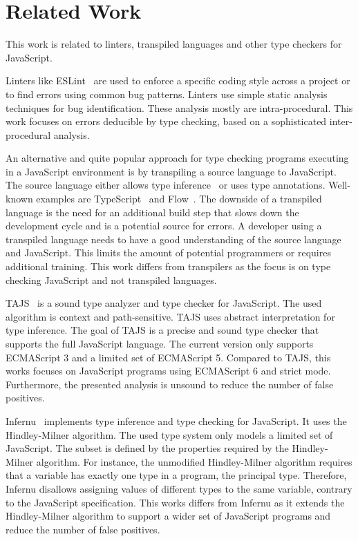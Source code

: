 \section{Related Work}\label{sec:related-work}
This work is related to linters, transpiled languages and other type checkers for JavaScript. 

Linters like ESLint~\cite{jQuery2016} are used to enforce a specific coding style across a project or to find errors using common bug patterns. Linters use simple static analysis techniques for bug identification. These analysis mostly are intra-procedural. This work focuses on errors deducible by type checking, based on a sophisticated inter-procedural analysis. 


An alternative and quite popular approach for type checking programs executing in a JavaScript environment is by transpiling a source language to JavaScript. The source language either allows type inference~\cite{Ekblad2012, McKenna} or uses type annotations. Well-known examples are TypeScript~\cite{Microsoft2012} and Flow~\cite{Facebook2014}. The downside of a transpiled language is the need for an additional build step that slows down the development cycle and is a potential source for errors. A developer using a transpiled language needs to have a good understanding of the source language and JavaScript. This limits the amount of potential programmers or requires additional training. This work differs from transpilers as the focus is on type checking JavaScript and not transpiled languages.

TAJS~\cite{JensenMollerThiemann2009} is a sound type analyzer and type checker for JavaScript. The used algorithm is context and path-sensitive. TAJS uses abstract interpretation for type inference. The goal of TAJS is a precise and sound type checker that supports the full JavaScript language. The current version only supports ECMAScript 3 and a limited set of ECMAScript 5. Compared to TAJS, this works focuses on JavaScript programs using ECMAScript 6 and strict mode. Furthermore, the presented analysis is unsound to reduce the number of false positives.

Infernu~\cite{Lewis} implements type inference and type checking for JavaScript. It uses the Hindley-Milner algorithm. The used type system only models a limited set of JavaScript. The subset is defined by the properties required by the Hindley-Milner algorithm. For instance, the unmodified Hindley-Milner algorithm requires that a variable has exactly one type in a program, the principal type. Therefore, Infernu disallows assigning values of different types to the same variable, contrary to the JavaScript specification. This works differs from Infernu as it extends the Hindley-Milner algorithm to support a wider set of JavaScript programs and reduce the number of false positives.

